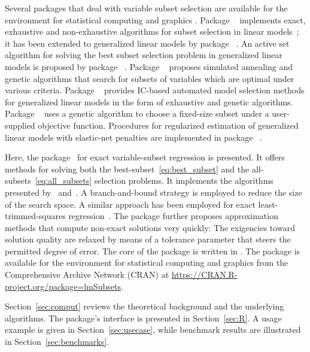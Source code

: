 \documentclass[article]{jss}
\newcommand{\R}{\proglang{R}}
\newcommand{\CXX}{\proglang{C++}}
\begin{document}
Several packages that deal with variable subset selection are
available for the {\R} environment for statistical computing and
graphics \citep{R}.  Package ~\citep{leaps} implements
exact, exhaustive and non-exhaustive algorithms for subset selection
in linear models~\citep{miller:02}; it has been extended to
generalized linear models by package ~\citep{bestglm}.
An active set algorithm for solving the best subset selection problem
in generalized linear models is proposed by package
~\citep{BeSS}.  Package ~\citep{subselect}
proposes simulated annealing and genetic algorithms that search for
subsets of variables which are optimal under various criteria.
Package ~\citep{glmulti} provides IC-based automated
model selection methods for generalized linear models in the form of
exhaustive and genetic algorithms.  Package
~\citep{wolters:j_stat_softw:15} uses a genetic algorithm
to choose a fixed-size subset under a user-supplied objective
function.  Procedures for regularized estimation of generalized linear
models with elastic-net penalties are implemented in package
~\citep{friedman:j_stat_softw:10}.

Here, the  package~\citep{lmSubsets} for exact
variable-subset regression is presented.  It offers methods for
solving both the best-subset~\eqref{eq:best_subset} and the
all-subsets~\eqref{eq:all_subsets} selection problems.  It implements
the algorithms presented by~\citet{gatu:j_comput_graph_stat:06}
and~\citet{hofmann:comput_stat_data_an:07}.  A branch-and-bound
strategy is employed to reduce the size of the search space.  A
similar approach has been employed for exact least-trimmed-squares
regression~\citep{hofmann:j_comput_graph_stat:10}.  The package
further proposes approximation methods that compute non-exact
solutions very quickly: The exigencies toward solution quality are
relaxed by means of a tolerance parameter that steers the permitted
degree of error.  The core of the package is written in {\CXX}.  The
package is available for the {\R} environment for statistical
computing and graphics from the Comprehensive {\R} Archive Network
(CRAN) at \url{https://CRAN.R-project.org/package=lmSubsets}.

Section~\ref{sec:comput} reviews the theoretical background and the
underlying algorithms.  The package's {\R} interface is presented in
Section~\ref{sec:R}.  A usage example is given in
Section~\ref{sec:usecase}, while benchmark results are illustrated in
Section~\ref{sec:benchmarks}.
\end{document}
